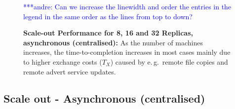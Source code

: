 \documentclass{rspublic}
\newcommand{\jhanote}[1]{ {\textcolor{red} { ***shantenu: #1 }}}
\newcommand{\alnote}[1]{ {\textcolor{blue} { ***andre: #1 }}}
\newcommand{\alnote}[1]{}
\newcommand{\jhanote}[1]{}
\begin{document}
%
\begin{figure}%
\centering
{}\qquad
\caption{\textbf{Scale-out Performance for 8, 16 and 32 Replicas, asynchronous (centralised):} 
  As the number of machines increases, the time-to-completion increases in most cases mainly
  due to higher exchange costs ($T_{X}$) caused by e.\,g.\  remote file copies and remote advert
  service updates.}
  \alnote{Can we increase the linewidth and order the entries in the legend in the same order
  as the lines from top to down?}
\label{fig:scaleout}


\end{figure}

\subsection{Scale out - Asynchronous (centralised)}
\end{document}
